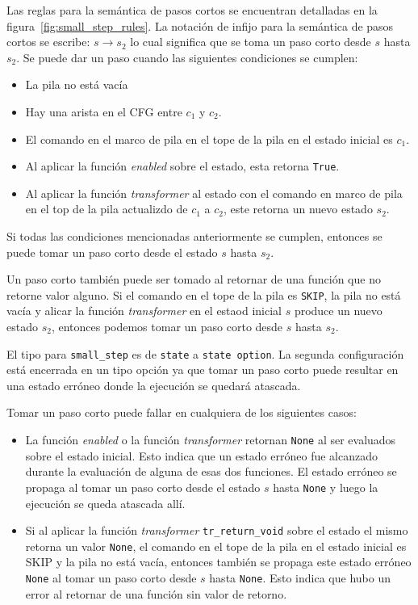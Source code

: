 Las reglas para la semántica de pasos cortos se encuentran detalladas en la figura~\ref{fig:small_step_rules}.
La notación de infijo para la semántica de pasos cortos se escribe: $s \rightarrow s_{2}$ lo cual significa que se toma un paso corto desde $s$ hasta $s_{2}$.
Se puede dar un paso cuando las siguientes condiciones se cumplen:

\begin{itemize}
  \item{La pila no está vacía}
  \item{Hay una arista en el CFG entre $c_{1}$ y $c_{2}$.}
  \item{El comando en el marco de pila en el tope de la pila en el estado inicial es $c_{1}$.}
  \item{Al aplicar la función \textit{enabled} sobre el estado, esta retorna \verb|True|.}
  \item{Al aplicar la función \textit{transformer} al estado con el comando en marco de pila en el top de la pila actualizdo de $c_{1}$ a $c_{2}$, este retorna un nuevo estado $s_{2}$.}
\end{itemize}

Si todas las condiciones mencionadas anteriormente se cumplen, entonces se puede tomar un paso corto desde el estado $s$ hasta $s_{2}$.

Un paso corto también puede ser tomado al retornar de una función que no retorne valor alguno.
Si el comando en el tope de la pila es \verb|SKIP|, la pila no está vacía y alicar la función \textit{transformer} en el estaod inicial $s$ produce un nuevo estado $s_{2}$, entonces podemos tomar un paso corto desde $s$ hasta $s_{2}$.

El tipo para \verb|small_step| es de \verb|state| a \verb|state option|.
La segunda configuración está encerrada en un tipo opción ya que tomar un paso corto puede resultar en una estado erróneo donde la ejecución se quedará atascada.

Tomar un paso corto puede fallar en cualquiera de los siguientes casos:

\begin{itemize}
  \item{La función \textit{enabled} o la función \textit{transformer} retornan \verb|None| al ser evaluados sobre el estado inicial.
  Esto indica que un estado erróneo fue alcanzado durante la evaluación de alguna de esas dos funciones.
  El estado erróneo se propaga al tomar un paso corto desde el estado $s$ hasta \verb|None| y luego la ejecución se queda atascada allí.}
  \item{Si al aplicar la función \textit{transformer} \verb|tr_return_void| sobre el estado el mismo retorna un valor \verb|None|, el comando en el tope de la pila en el estado inicial es SKIP y la pila no está vacía, entonces también se propaga este estado erróneo \verb|None| al tomar un paso corto desde $s$ hasta \verb|None|.
  Esto indica que hubo un error al retornar de una función sin valor de retorno.}
\end{itemize}


